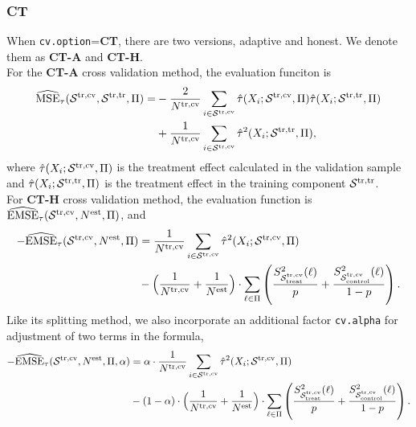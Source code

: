 \documentclass[11pt]{article}
\newcommand{\emse}{{\rm EMSE}}
\newcommand{\est}{{\rm est}}
\newcommand{\calp}{{\Pi}}
\newcommand{\cals}{{\cal S}}
\newcommand{\mse}{{\rm MSE}}
\newcommand{\control}{{\rm control}}
\newcommand{\treat}{{\rm treat}}
\newcommand{\train}{{\rm tr}}
\newcommand{\tcv}{{\rm cv}}
\begin{document}
\subsubsection{CT}
When \texttt{cv.option}=\textbf{CT}, there are two versions, adaptive and honest. We denote them as \textbf{CT-A} and \textbf{CT-H}. \\
For the \textbf{CT-A} cross validation method, the evaluation funciton is
\begin{align*}
\widehat{\mse}_\tau(\cals^{\train, \tcv},\cals^{\train, \train},\calp) =&
-\frac{2}{N^{\train, \tcv}}\sum_{i\in\cals^{\train, \tcv}}\hat\tau(X_i;\cals^{\train, \tcv},\calp)\hat\tau(X_i;\cals^{\train, \train},\calp)\\
& + \frac{1}{N^{\train, \tcv}}\sum_{i\in\cals^{\train, \tcv}}\hat\tau^2(
X_i;\cals^{\train, \train},\calp),
\end{align*}
where $\hat\tau(X_i;\cals^{\train, \tcv},\calp)$ is the treatment effect calculated in the validation sample and $\hat\tau(X_i;\cals^{\train, \train},\calp)$ is the treatment effect in the training component $\cals^{\train, \train}$.\\
For \textbf{CT-H} cross validation method, the evaluation function is $\widehat{\emse}_\tau(\cals^{\train, \tcv}, N^\est, \calp)$, and
\begin{align*}
-\widehat{\emse}_\tau(\cals^{\train, \tcv}, N^\est, \calp) & =
\frac{1}{N^{\train, \tcv}}\sum_{i\in\cals^{\train, \tcv}} \hat\tau^2(X_i;\cals^{\train, \tcv},\calp) \\
& -
\Bigl(\frac{1}{N^{\train, \tcv}} + \frac{1}{N^\est}\Bigr)\cdot \sum_{\ell\in\calp}
\left( \frac{S^2_{\cals^{\train, \tcv}_\treat}(\ell)}{p}+ \frac{S^2_{\cals^{\train, \tcv}_\control}(\ell)}{1-p}\right).
\end{align*}
Like its splitting method, we also incorporate an additional factor \texttt{cv.alpha} for adjustment of two terms in the formula,
\begin{align*}
-\widehat{\emse}_\tau(\cals^{\train, \tcv}, N^\est, \calp, \alpha) & =
\alpha \cdot \frac{1}{N^{\train, \tcv}}\sum_{i\in\cals^{\train, \tcv}} \hat\tau^2(X_i;\cals^{\train, \tcv},\calp) \\
& - (1 - \alpha) \cdot
\Bigl(\frac{1}{N^{\train, \tcv}} + \frac{1}{N^\est}\Bigr)\cdot \sum_{\ell\in\calp}
\left( \frac{S^2_{\cals^{\train, \tcv}_\treat}(\ell)}{p}+ \frac{S^2_{\cals^{\train, \tcv}_\control}(\ell)}{1-p}\right).
\end{align*}
\end{document}
